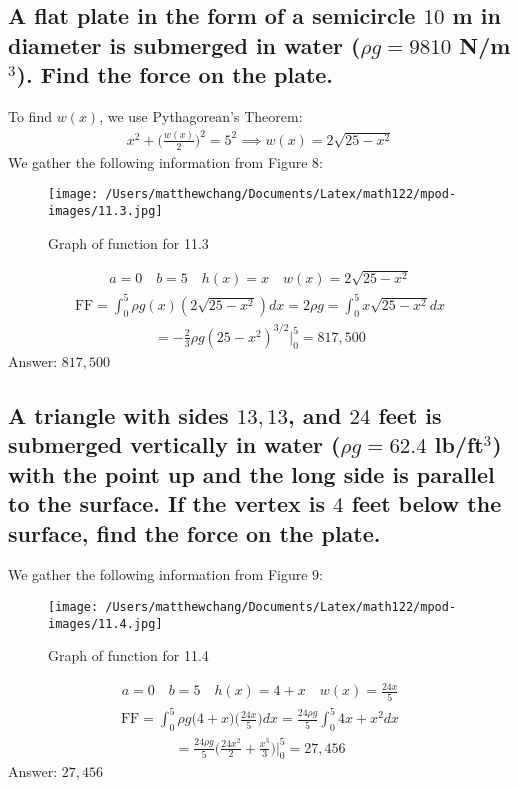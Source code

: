 \documentclass{article}
\begin{document}
\subsection{A flat plate in the form of a semicircle $10$ m in diameter is submerged in water ($\rho g =9810$ N/m$^3$). Find the force on the plate.}
To find $w(x)$, we use Pythagorean's Theorem:
\begin{align*}
	x^2 + \bigg( \frac{w(x)}{2} \bigg)^2 = 5^2 \implies w(x) = 2\sqrt{25 - x^2}
\end{align*}
We gather the following information from Figure 8:
\begin{figure}
	\centering
	\texttt{[image: /Users/matthewchang/Documents/Latex/math122/mpod-images/11.3.jpg]}
	\caption{Graph of function for 11.3}
\end{figure}
\begin{align*}
	a = 0 \quad b = 5 \quad h(x) = x \quad w(x) = 2\sqrt{25 - x^2}
\end{align*}
\begin{align*}
	\text{FF} = \int_0^5 {\rho g (x) (2\sqrt{25 - x^2}) dx} = 2\rho g = \int_0^5 {x\sqrt{25 - x^2}dx}
\end{align*}
\begin{align*}
	= -\frac{2}{3} \rho g (25 - x^2)^{3/2} \bigg|_0^5 = 817,500
\end{align*}
Answer: $817,500$

\subsection{A triangle with sides $13, 13$, and $24$ feet is submerged vertically in water ($\rho g =62.4$ lb/ft$^3$) with the point up and the long side is parallel to the surface. If the vertex is $4$ feet below the surface, find the force on the plate.}
We gather the following information from Figure 9:
\begin{figure}
	\centering
	\texttt{[image: /Users/matthewchang/Documents/Latex/math122/mpod-images/11.4.jpg]}
	\caption{Graph of function for 11.4}
\end{figure}
\begin{align*}
	a = 0 \quad b = 5 \quad h(x) = 4 + x \quad w(x) = \frac{24x}{5}
\end{align*}
\begin{align*}
	\text{FF} = \int_0^5 {\rho g \bigg( 4 + x \bigg) \bigg( \frac{24x}{5} \bigg) dx} = \frac{24 \rho g}{5} \int_0^5 {4x + x^2 dx}
\end{align*}
\begin{align*}
	= \frac{24\rho g}{5} \bigg( \frac{24x^2}{2} + \frac{x^3}{3} \bigg) \bigg|_0^5 = 27,456
\end{align*}
Answer: $27,456$
\end{document}
